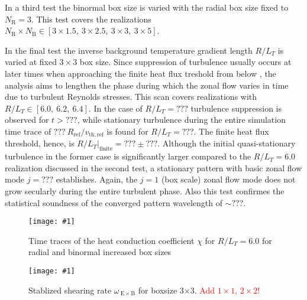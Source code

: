 \documentclass[aip, amsmath, amssymb, reprint, twocolumn]{revtex4-1}
\newcommand{\includegraphicsOneCol}[3]{
	\begin{figure}[ht]
		\texttt{[image: \#1]}
		\caption{#2}
		\label{#3}
  	\end{figure}
  	\increasecounter{fig}{1}
}
\newcommand{\NR}{N_\mathrm{R}}
\newcommand{\NB}{N_\mathrm{B}}
\newcommand{\vthref}{v_\mathrm{th,ref}}
\newcommand{\Rref}{R_\mathrm{ref}}
\newcommand{\rlt}{R/L_T}
\begin{document}
In a third test the binormal box size is varied with the radial box size fixed to $\NR = 3$.
This test covers the realizations $\NR \times \NB \in [3\times1.5,~3\times2.5,~3\times3,~3\times5]$.
\bigskip

In the final test the inverse background temperature gradient length $\rlt$ is varied at fixed $3\times3$ box size.
Since suppression of turbulence usually occurs at later times when approaching the finite heat flux treshold from below \cite{peeters2016}, the analysis aims to lengthen the phase during which the zonal flow varies in time due to turbulent Reynolds stresses.
This scan covers realizations with $\rlt \in [6.0,~6.2,~6.4]$.
In the case of $\rlt = ???$ turbulence suppression is observed for $t > ???$, while stationary turbulence during the entire simulation time trace of $???~\Rref/\vthref$ is found for $\rlt = ???$.
The finite heat flux threshold, hence, is $\rlt|_\mathrm{finite} = ??? \pm ???$.
Although the initial quasi-stationary turbulence in the former case is significantly larger compared to the $\rlt = 6.0$ realization discussed in the second test, a stationary pattern with basic zonal flow mode $j = ???$ establishes. 
Again, the $j = 1$ (box scale) zonal flow mode does not grow secularly during the entire turbulent phase.
Also this test confirmes the statistical soundness of the converged pattern wavelength of $\sim ???$.

\includegraphicsOneCol{{Comparison/Boxsize/S6_rlt6.0_boxsize1x1-2x2-3x3_Ns16_Nvpar48_Nmu9_eflux_comparison}.pdf}{
	Time traces of the heat conduction coefficient $\chi$ for $R/L_T = 6.0$ for radial and binormal increased box sizes
}{fig:eflux-1x1-2x2-3x3-comparison}

\includegraphicsOneCol{{S6_rlt6.0/boxsize3x3/Ns16/Nvpar48/Nmu9/S6_rlt6.0_boxsize3x3_Ns16_Nvpar48_Nmu9_wexb_selection}.pdf}{
	Stablized shearing rate $\omega_{\mathrm{\:E \times B}}$ for boxsize 3$\times$3. \textcolor{red}{Add $1\times1$, $2\times2$!}
}{fig:wexb-3x3-stable} 



\end{document}
